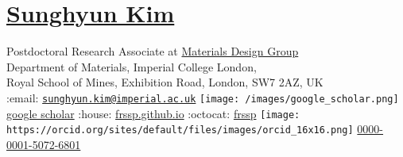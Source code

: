 \hypertarget{sunghyun-kim}{%
\section{\texorpdfstring{\href{pdf/cv.pdf}{Sunghyun
Kim}}{Sunghyun Kim}}\label{sunghyun-kim}}

Postdoctoral Research Associate at
\href{https://wmd-group.github.io}{Materials Design Group}\\
Department of Materials, Imperial College London,\\
Royal School of Mines, Exhibition Road, London, SW7 2AZ, UK\\
:email:
\href{mailto:sunghyun.kim@imperial.ac.uk}{\nolinkurl{sunghyun.kim@imperial.ac.uk}}
\textbar{} \texttt{[image: /images/google\_scholar.png]}
\href{https://scholar.google.co.uk/citations?user=v438vEAAAAAJ}{google
scholar} \textbar{} :house:
\href{https://frssp.github.io}{frssp.github.io} \textbar{} :octocat:
\href{https://github.com/frssp}{frssp} \textbar{}
\texttt{[image: https://orcid.org/sites/default/files/images/orcid\_16x16.png]}
\href{https://orcid.org/0000-0001-5072-6801}{0000-0001-5072-6801}

